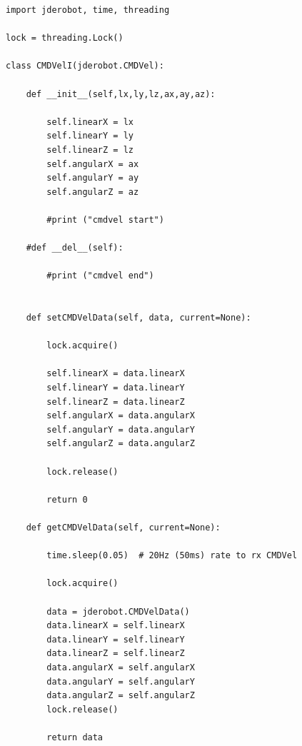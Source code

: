 \clearpage
\begin{lstlisting}[frame=single]
import jderobot, time, threading

lock = threading.Lock()

class CMDVelI(jderobot.CMDVel):

    def __init__(self,lx,ly,lz,ax,ay,az):

        self.linearX = lx
        self.linearY = ly
        self.linearZ = lz
        self.angularX = ax
        self.angularY = ay
        self.angularZ = az

        #print ("cmdvel start")

    #def __del__(self):

        #print ("cmdvel end")


    def setCMDVelData(self, data, current=None):

        lock.acquire()

        self.linearX = data.linearX
        self.linearY = data.linearY
        self.linearZ = data.linearZ
        self.angularX = data.angularX
        self.angularY = data.angularY
        self.angularZ = data.angularZ

        lock.release()

        return 0

    def getCMDVelData(self, current=None):

        time.sleep(0.05)  # 20Hz (50ms) rate to rx CMDVel

        lock.acquire()

        data = jderobot.CMDVelData()
        data.linearX = self.linearX
        data.linearY = self.linearY
        data.linearZ = self.linearZ
        data.angularX = self.angularX
        data.angularY = self.angularY
        data.angularZ = self.angularZ
        lock.release()

        return data
        
\end{lstlisting} 

